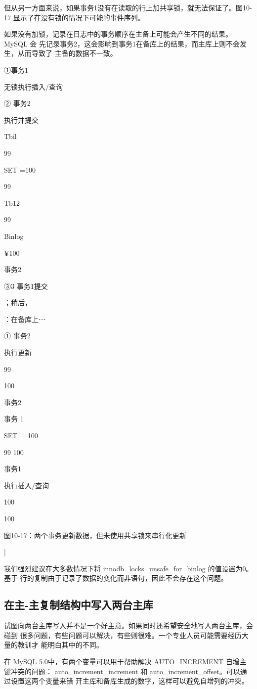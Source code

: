 但从另一方面来说，如果事务1没有在读取的行上加共享锁，就无法保证了。图10-17
显示了在没有锁的情况下可能的事件序列。

如果没有加锁，记录在日志中的事务顺序在主备上可能会产生不同的结果。MySQL 会
先记录事务2，这会影响到事务1在备库上的结果，而主库上则不会发生，从而导致了
主备的数据不一致。

①事务1

无锁执行插入/查询

② 事务2

执行并提交

Tbil

99

SET =100

99

Tb12

99

Binlog

¥100

事务2

③3 事务1提交

；稍后，

：在备库上⋯

① 事务2

执行更新

99

100

事务2

事务 1

SET = 100

99 100

事务1

执行插入/查询

100

100

图10-17：两个事务更新数据，但未使用共享锁来串行化更新

|

我们强烈建议在大多数情况下将 innodb\_locks\_unsafe\_for\_binlog 的值设置为0。基于
行的复制由于记录了数据的变化而非语句，因此不会存在这个问题。

\subsection{在主-主复制结构中写入两台主库}
试图向两台主库写入并不是一个好主意。如果同时还希望安全地写人两台主库，会碰到
很多问题，有些问题可以解决，有些则很难。一个专业人员可能需要经历大量的教训才
能明白其中的不同。

在 MySQL 5.0中，有两个变量可以用于帮助解决 AUTO\_INCREMENT 自增主键冲突的问题：
auto\_increment\_increment 和 auto\_increment\_offset。可以通过设置这两个变量来错
开主库和备库生成的数字，这样可以避免自增列的冲突。

